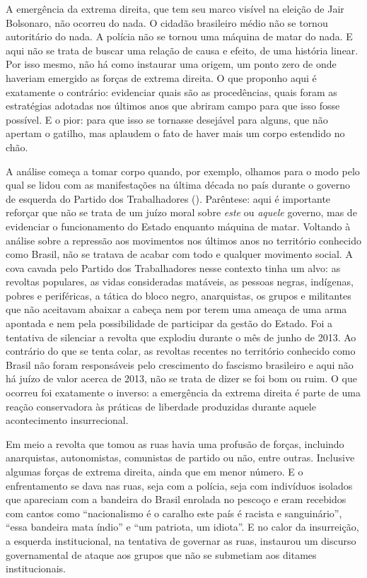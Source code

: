 A emergência da extrema direita, que tem seu marco visível na eleição de
Jair Bolsonaro, não ocorreu do nada. O cidadão brasileiro médio não se
tornou autoritário do nada. A polícia não se tornou uma máquina de matar
do nada. E aqui não se trata de buscar uma relação de causa e efeito, de
uma história linear. Por isso mesmo, não há como instaurar uma origem,
um ponto zero de onde haveriam emergido as forças de extrema direita. O
que proponho aqui é exatamente o contrário: evidenciar quais são as
procedências, quais foram as estratégias adotadas nos últimos anos que
abriram campo para que isso fosse possível. E o pior: para que isso se
tornasse desejável para alguns, que não apertam o gatilho, mas aplaudem
o fato de haver mais um corpo estendido no chão.

A análise começa a tomar corpo quando, por exemplo, olhamos para o modo
pelo qual se lidou com as manifestações na última década no país durante
o governo de esquerda do Partido dos Trabalhadores (). Parêntese: aqui
é importante reforçar que não se trata de um juízo moral sobre
\emph{este} ou \emph{aquele} governo, mas de evidenciar o funcionamento
do Estado enquanto máquina de matar. Voltando à análise sobre a
repressão aos movimentos nos últimos anos no território conhecido como
Brasil, não se tratava de acabar com todo e qualquer movimento social. A
cova cavada pelo Partido dos Trabalhadores nesse contexto tinha um alvo:
as revoltas populares, as vidas consideradas matáveis, as pessoas
negras, indígenas, pobres e periféricas, a tática do bloco negro,
anarquistas, os grupos e militantes que não aceitavam abaixar a cabeça
nem por terem uma ameaça de uma arma apontada e nem pela possibilidade
de participar da gestão do Estado. Foi a tentativa de silenciar a
revolta que explodiu durante o mês de junho de 2013. Ao contrário do que
se tenta colar, as revoltas recentes no território conhecido como Brasil
não foram responsáveis pelo crescimento do fascismo brasileiro e aqui
não há juízo de valor acerca de 2013, não se trata de dizer se foi bom
ou ruim. O que ocorreu foi exatamente o inverso: a emergência da
extrema direita é parte de uma reação conservadora às práticas de
liberdade produzidas durante aquele acontecimento insurrecional.

Em meio a revolta que tomou as ruas havia uma profusão de forças,
incluindo anarquistas, autonomistas, comunistas de partido ou não, entre
outras. Inclusive algumas forças de extrema direita, ainda que em menor
número. E o enfrentamento se dava nas ruas, seja com a polícia, seja com
indivíduos isolados que apareciam com a bandeira do Brasil enrolada no
pescoço e eram recebidos com cantos como ``nacionalismo é o caralho este
país é racista e sanguinário'', ``essa bandeira mata índio'' e ``um
patriota, um idiota''. E no calor da insurreição, a esquerda
institucional, na tentativa de governar as ruas, instaurou um discurso
governamental de ataque aos grupos que não se submetiam aos ditames
institucionais.

